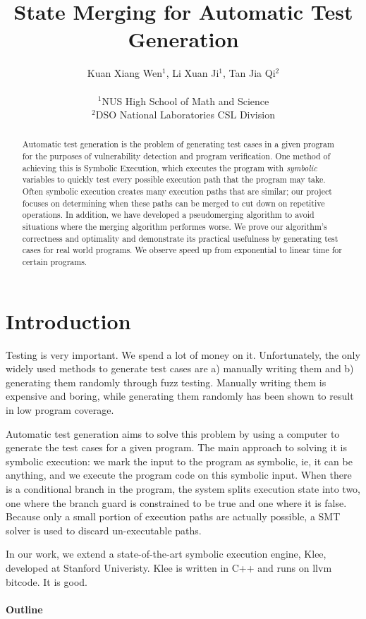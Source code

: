 \documentclass[12pt,twocolumn,a4paper]{article}
\title{State Merging for Automatic Test Generation}
\date{}
\author{
Kuan Xiang Wen$^{1}$, Li Xuan Ji$^{1}$, Tan Jia Qi$^{2}$\\
\vspace{1 mm} \\
\small{$^{1}$NUS High School of Math and Science}\\
\small{$^{2}$DSO National Laboratories CSL Division}
}
\begin{document}
\maketitle
\begin{abstract}
Automatic test generation is the problem of generating test cases in a given program for the purposes of vulnerability detection and program verification. One method of achieving this is Symbolic Execution, which executes the program with \emph{symbolic} variables to quickly test every possible execution path that the program may take. Often symbolic execution creates many execution paths that are similar; our project focuses on determining when these paths can be merged to cut down on repetitive operations. In addition, we have developed a pseudomerging algorithm to avoid situations where the merging algorithm performes worse. We prove our algorithm's correctness and optimality and demonstrate its practical usefulness by generating test cases for real world programs. We observe speed up from exponential to linear time for certain programs.
\end{abstract}

\section{Introduction}
Testing is very important. We spend a lot of money on it. Unfortunately, the only widely used methods to generate test cases are a) manually writing them and b) generating them randomly through fuzz testing. Manually writing them is expensive and boring, while generating them randomly has been shown to result in low program coverage. 

Automatic test generation aims to solve this problem by using a computer to generate the test cases for a given program. The main approach to solving it is symbolic execution: we mark the input to the program as symbolic, ie, it can be anything, and we execute the program code on this symbolic input. When there is a conditional branch in the program, the system splits execution state into two, one where the branch guard is constrained to be true and one where it is false. Because only a small portion of execution paths are actually possible, a SMT solver is used to discard un-executable paths. 

In our work, we extend a state-of-the-art symbolic execution engine, Klee, developed at Stanford Univeristy. Klee is written in C++ and runs on llvm bitcode. It is good.

\paragraph{Outline}
\end{document}
